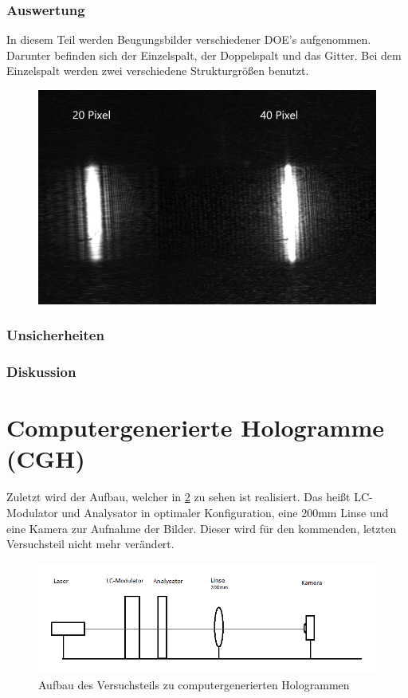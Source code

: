 \subsubsection{Auswertung}
In diesem Teil werden Beugungsbilder verschiedener DOE's aufgenommen. Darunter befinden sich der Einzelspalt, der Doppelspalt und das Gitter. Bei dem Einzelspalt werden zwei verschiedene Strukturgrößen benutzt.
\begin{figure}[h!]
	\centering
	\includegraphics[scale = 1]{pixelverg.png}
	\caption{}
	\label{verg}
\end{figure}

\subsubsection{Unsicherheiten}
\subsubsection{Diskussion}


\section{Computergenerierte Hologramme (CGH)}
Zuletzt wird der Aufbau, welcher in \cref{cghskizze} zu sehen ist realisiert. Das heißt LC-Modulator und Analysator in optimaler Konfiguration, eine 200mm Linse und eine Kamera zur Aufnahme der Bilder. Dieser wird für den kommenden, letzten Versuchsteil nicht mehr verändert.

\begin{figure}
	\centering
	\includegraphics[scale=0.8]{cgh_skizze.png}
	\caption{Aufbau des Versuchsteils zu computergenerierten Hologrammen}
	\label{cghskizze}
\end{figure}

